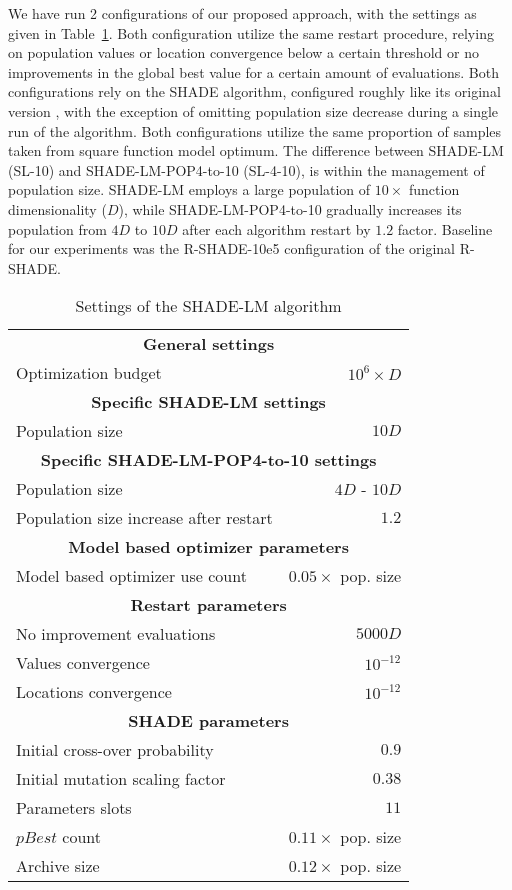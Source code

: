 \documentclass[sigconf]{acmart}
\begin{document}
We have run 2 configurations of our proposed approach,
with the settings as given in Table~\ref{tab:algorithm-settings}.
Both configuration utilize the same restart procedure,
relying on population values or location convergence
below a certain threshold or no improvements in the global best
value for a certain amount of evaluations.
Both configurations rely on the SHADE algorithm,
configured roughly like its original version \cite{Tanabe2014},
with the exception of omitting population size decrease during
a single run of the algorithm.
Both configurations utilize the same proportion of samples
taken from square function model optimum.
The difference between SHADE-LM (SL-10) and SHADE-LM-POP4-to-10 (SL-4-10),
is within the management of population size.
SHADE-LM employs a large population of $10 \times$ function dimensionality ($D$),
while SHADE-LM-POP4-to-10 gradually increases its population from
$4D$ to $10D$ after each algorithm restart
by $1.2$ factor.
Baseline for our experiments was the R-SHADE-10e5 configuration of the original R-SHADE\cite{Tanabe2014}.

\begin{table}[!ht]
	\caption{Settings of the SHADE-LM algorithm
	\label{tab:algorithm-settings}}
	\begin{center}
	\begin{tabular}{lr}
		\multicolumn{2}{c}{\textbf{General settings}} \\
		Optimization budget & $10^6 \times D$ \\
		\multicolumn{2}{c}{\textbf{Specific SHADE-LM settings}} \\
		Population size & $10D$ \\
		\multicolumn{2}{c}{\textbf{Specific SHADE-LM-POP4-to-10 settings}} \\
		Population size & $4D$ - $10D$ \\
		Population size increase after restart & $1.2$ \\
		\multicolumn{2}{c}{\textbf{Model based optimizer parameters}} \\
		Model based optimizer use count & $0.05 \times$ pop. size \\
		\multicolumn{2}{c}{\textbf{Restart parameters}} \\
    No improvement evaluations & $5000D$ \\
    Values convergence & $10^{-12}$ \\
    Locations convergence & $10^{-12}$ \\
		\multicolumn{2}{c}{\textbf{SHADE parameters}} \\
		Initial cross-over probability & $0.9$ \\
		Initial mutation scaling factor & $0.38$ \\
    Parameters slots & $11$ \\
    $pBest$ count & $0.11 \times$ pop. size \\
    Archive size & $0.12 \times$ pop. size \\
	\end{tabular}
\end{center}
\end{table}
\end{document}
